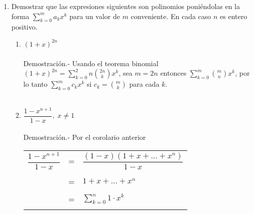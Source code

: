 \begin{enumerate}[ \bfseries 1.]
        \item Demostrar que las expresiones siguientes son polinomios poniéndolas en la forma $\displaystyle\sum_{k=0}^m a_k x^k$ para un valor de $m$ conveniente. En cada caso $n$ es entero positivo.
            \begin{enumerate}[\bfseries (a)]
                \item $(1+x)^{2n}$\\\\
                Demostración.- \; Usando el teorema binomial $(1+x)^{2n} = \displaystyle\sum_{k=0}^2n {2n \choose k} x^k$, sea $m=2n$ entonces $\displaystyle\sum_{k=0}^m {m \choose n} x^k$, por lo tanto $\displaystyle\sum_{k=0}^m c_k x^k$ si $c_k = {m \choose k} $ para cada $k$.\\\\

                \item $\dfrac{1- x^{n+1}}{1-x}, \; x \neq 1$\\\\
                Demostración.- \; Por el corolario anterior 
                    \begin{center}
                        \begin{tabular}{r c l}
                            $\dfrac{1 - x^{n+1}}{1-x}$&=&$\dfrac{(1-x)(1+x+...+x^n)}{1-x}$\\\\
                            &=&$1 + x + ... + x^n$\\\\
                            &=&$\displaystyle\sum_{k=0}^n 1 \cdot x^k$\\\\
                        \end{tabular}
                    \end{center}


\end{enumerate}
\end{enumerate}

